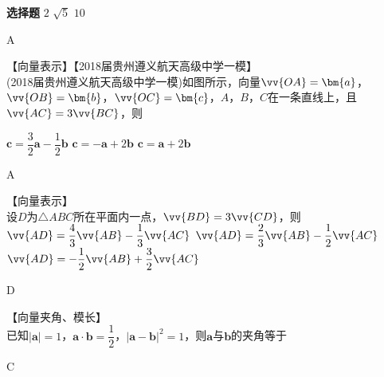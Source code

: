 \begin{exercise}{\bf 选择题}
       {$2$}
       {$\sqrt5$}
       {$10$}
      \begin{answer}
        A
      \end{answer}
    \item 【向量表示】【2018届贵州遵义航天高级中学一模】\\
      (2018届贵州遵义航天高级中学一模)如图所示，向量$\vv{OA}=\bm{a}$，$\vv{OB}=\bm{b}$，$\vv{OC}=\bm{c}$，$A$，$B$，$C$在一条直线上，且$\vv{AC}=3\vv{BC}$，则\xz
      \begin{minipage}[b]{0.7\linewidth}
          {$\bm{c}=\dfrac32\bm{a}-\dfrac12\bm{b}$}
          {$\bm{c}=-\bm{a}+2\bm{b}$}
          {$\bm{c}=\bm{a}+2\bm{b}$}
      \end{minipage}\hfill
      \begin{minipage}[htbp!]{0.3\linewidth}
        \begin{center}
        \end{center}
      \end{minipage}
      \begin{answer}
        A
      \end{answer}
    \item 【向量表示】\\
      设$D$为$\triangle{ABC}$所在平面内一点，$\vv{BD}=3\vv{CD}$，则\xz
       {$\vv{AD}=\dfrac43\vv{AB}-\dfrac13\vv{AC}$}
       {$\vv{AD}=\dfrac23\vv{AB}-\dfrac12\vv{AC}$}
       {$\vv{AD}=-\dfrac12\vv{AB}+\dfrac32\vv{AC}$}
      \begin{answer}
        D
      \end{answer}
    \item 【向量夹角、模长】\\
      已知$|\bm a|=1$，$\bm a\cdot\bm b=\dfrac12$，$|\bm a-\bm b|^2=1$，则$\bm a$与$\bm b$的夹角等于\xz
      \xx{30\degree}{45\degree}{60\degree}{120\degree}
      \begin{answer}
        C
      \end{answer}

\end{exercise}
